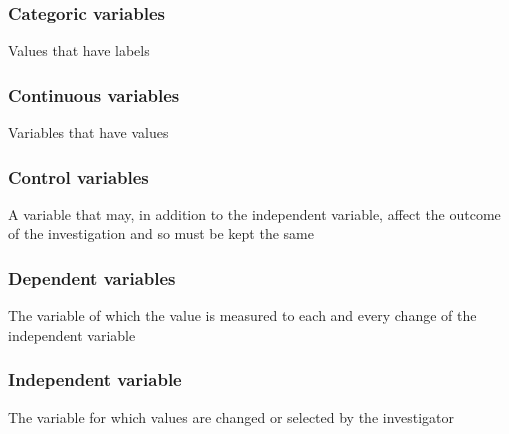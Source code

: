 \documentclass{article}[18pt]
\begin{document}
\subsubsection{Categoric variables}
Values that have labels
\subsubsection{Continuous variables}
Variables that have values
\subsubsection{Control variables}
A variable that may, in addition to the independent variable, affect the outcome of the investigation and so must be kept the same
\subsubsection{Dependent variables}
The variable of which the value is measured to each and every change of the independent variable
\subsubsection{Independent variable}
The variable for which values are changed or selected by the investigator
\end{document}
